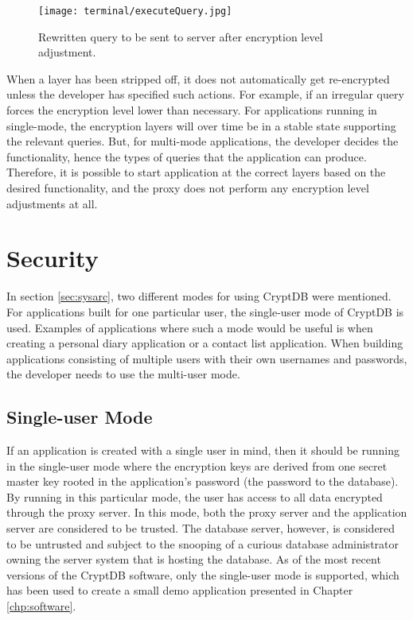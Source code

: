 \begin{figure}[h]
	\texttt{[image: terminal/executeQuery.jpg]}
	\caption{Rewritten query to be sent to server after encryption level adjustment.}
	\label{rewritten_query}
\end{figure}

When a layer has been stripped off, it does not automatically get re-encrypted unless the developer has specified such actions. For example, if an irregular query forces the encryption level lower than necessary. For applications running in single-mode, the encryption layers will over time be in a stable state supporting the relevant queries. But, for multi-mode applications, the developer decides the functionality, hence the types of queries that the application can produce. Therefore, it is possible to start application at the correct layers based on the desired functionality, and the proxy does not perform any encryption level adjustments at all.



\section{Security}

In section \ref{sec:sysarc}, two different modes for using CryptDB were mentioned. For applications built for one particular user, the single-user mode of CryptDB is used. Examples of applications where such a mode would be useful is when creating a personal diary application or a contact list application. When building applications consisting of multiple users with their own usernames and passwords, the developer needs to use the multi-user mode.

\subsection{Single-user Mode}
If an application is created with a single user in mind, then it should be running in the single-user mode where the encryption keys are derived from one secret master key rooted in the application's password (the password to the database). By running in this particular mode, the user has access to all data encrypted through the proxy server. In this mode, both the proxy server and the application server are considered to be trusted. The database server, however, is considered to be untrusted and subject to the snooping of a curious database administrator owning the server system that is hosting the database. As of the most recent versions of the CryptDB software, only the single-user mode is supported, which has been used to create a small demo application presented in Chapter \ref{chp:software}.

